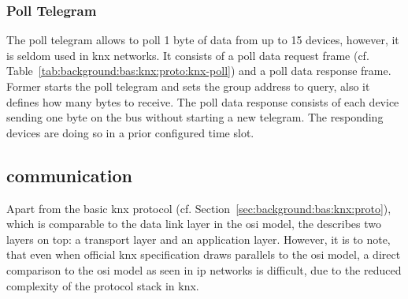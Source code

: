 

\subsubsection{Poll Telegram}

The poll telegram allows to poll 1 byte of data from up to 15 devices, however, it is seldom used in \gls{knx} networks. It consists of a poll data request frame (cf. Table~\ref{tab:background:bas:knx:proto:knx-poll}) and a poll data response frame. Former starts the poll telegram and sets the group address to query, also it defines how many bytes to receive.
The poll data response consists of each device sending one byte on the bus without starting a new telegram. The responding devices are doing so in a prior configured time slot. \parencite{Hubner2009,DIN_EN_50090-5-2}



\subsection{\knx communication}
\label{sec:background:bas:knx:communication}

Apart from the basic \gls{knx} protocol (cf. Section~\ref{sec:background:bas:knx:proto}), which is comparable to the data link layer in the \gls{osi} model, the \textcite{DIN_EN_50090-4-1} describes two layers on top: a transport layer and an application layer.
However, it is to note, that even when official \gls{knx} specification draws parallels to the \gls{osi} model, a direct comparison to the \gls{osi} model as seen in \gls{ip} networks is difficult, due to the reduced complexity of the protocol stack in \gls{knx}.

